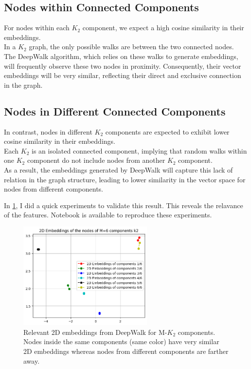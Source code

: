 \documentclass[a4paper]{article}
\begin{document}
\subsection*{Nodes within Connected Components}
For nodes within each $K_2$ component, we expect a high cosine similarity in their embeddings. \\
In a $K_2$ graph, the only possible walks are between the two connected nodes. \\
The DeepWalk algorithm, which relies on these walks to generate embeddings,
will frequently observe these two nodes in proximity. 
Consequently, their vector embeddings will be very similar,
reflecting their direct and exclusive connection in the graph.

\subsection*{Nodes in Different Connected Components}
In contrast, nodes in different $K_2$ components are expected to exhibit lower cosine similarity in their embeddings. \\
Each $K_2$ is an isolated connected component, 
implying that random walks within one $K_2$ component do not include nodes from another $K_2$ component. \\
As a result, the embeddings generated by DeepWalk will capture this lack of relation in the graph structure, 
leading to lower similarity in the vector space for nodes from different components.

In \ref{fig:m_components}, I did a quick experiments to validate this result. This reveals the relavance of the features.
Notebook is available to reproduce these experiments.


\begin{figure}[ht]
    \centering
    \includegraphics[width=0.6\textwidth]{figures/m_k2_graph_2d_embeddings.png}
    \caption{Relevant 2D embeddings from DeepWalk for  M-$K_2$ components. Nodes inside the same components (same color) have 
    very similar 2D embeddings whereas nodes from different components are farther away.}
    \label{fig:m_components}
\end{figure}
\end{document}
